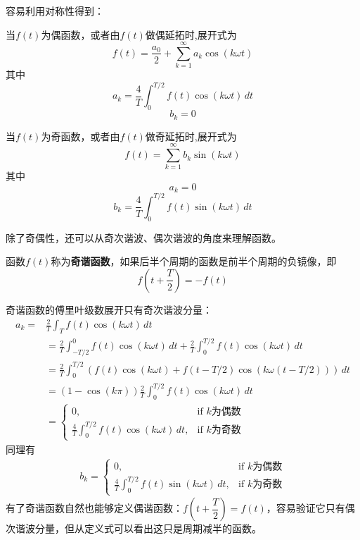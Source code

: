\documentclass{ctexbook}
\begin{document}
容易利用对称性得到：
\begin{claim}[偶函数的傅里叶展开]
当$f(t)$为偶函数，或者由$f(t)$做偶延拓时,展开式为
\[f(t)=\frac{a_0}{2}+\sum_{k = 1}^{\infty} a_k\cos(k\omega t)\]
其中
\[a_k=\frac{4}{T}\int_{0}^{T/2} f(t)\cos(k\omega t)\,dt\]
\[b_k=0\]
\end{claim}\begin{claim}[奇函数的傅里叶展开]
当$f(t)$为奇函数，或者由$f(t)$做奇延拓时,展开式为
\[f(t)=\sum_{k = 1}^{\infty} b_k \sin(k\omega t)\]
其中
\[a_k=0\]
\[b_k=\frac{4}{T}\int_{0}^{T/2} f(t)\sin(k\omega t)\,dt\]
\end{claim}

除了奇偶性，还可以从奇次谐波、偶次谐波的角度来理解函数。
\begin{definition}[奇谐函数]
    函数$f(t)$称为\textbf{奇谐函数}，如果后半个周期的函数是前半个周期的负镜像，即\begin{equation*}
    f\left(t+\frac{T}{2}\right)=-f(t)
\end{equation*}
\end{definition}
奇谐函数的傅里叶级数展开只有奇次谐波分量：
\begin{align*}
    a_k =&\frac{2}{T}\int_{T}f(t)\cos(k\omega t)\,dt\\
    &=\frac{2}{T}\int_{-T/2}^{0}f(t)\cos(k\omega t)\,dt+\frac{2}{T}\int_{0}^{T/2}f(t)\cos(k\omega t)\,dt\\
    &=\frac{2}{T}\int_{0}^{T/2}\left(f(t)\cos(k\omega t)+f(t-T/2)\cos(k\omega(t-T/2))\right)\,dt\\
    &=(1-\cos(k\pi))\frac{2}{T}\int_{0}^{T/2}f(t)\cos(k\omega t)\,dt\\
    &=\begin{cases}
        0,&\text{if }k\text{为偶数}\\
        \frac{4}{T}\int_{0}^{T/2}f(t)\cos(k\omega t)\,dt,&\text{if }k\text{为奇数}
    \end{cases}
\end{align*}
同理有\begin{align*}
    b_k=\begin{cases}
        0,&\text{if }k\text{为偶数}\\
        \frac{4}{T}\int_{0}^{T/2}f(t)\sin(k\omega t)\,dt,&\text{if }k\text{为奇数}
    \end{cases}
\end{align*}
有了奇谐函数自然也能够定义偶谐函数：$f\left(t+\dfrac{T}{2}\right)=f(t)$，容易验证它只有偶次谐波分量，但从定义式可以看出这只是周期减半的函数。
\end{document}
